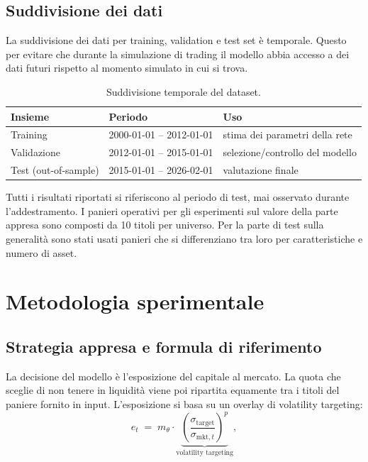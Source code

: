 \subsection{Suddivisione dei dati}
La suddivisione dei dati per training, validation e test set è temporale. 
Questo per evitare che durante la simulazione di trading il modello abbia accesso a dei dati futuri rispetto al momento simulato in cui si trova.

\begin{table}[H]
\centering
\begin{tabular}{lll}
\toprule
Insieme & Periodo & Uso \\
\midrule
Training     & 2000-01-01 -- 2012-01-01 & stima dei parametri della rete \\
Validazione  & 2012-01-01 -- 2015-01-01 & selezione/controllo del modello \\
Test (out-of-sample) & 2015-01-01 -- 2026-02-01 & valutazione finale \\
\bottomrule
\end{tabular}
\caption{Suddivisione temporale del dataset.}
\label{tab:split}
\end{table}

Tutti i risultati riportati si riferiscono al periodo di test, mai
osservato durante l'addestramento. I panieri operativi per gli esperimenti sul valore della parte appresa sono composti da 10
titoli per universo. Per la parte di test sulla generalità sono stati usati panieri che si differenziano tra loro per caratteristiche e numero di asset.


\section{Metodologia sperimentale}
\label{sec:metodi}

\subsection{Strategia appresa e formula di riferimento}
La decisione del modello è l'esposizione del capitale al mercato. 
La quota che sceglie di non tenere in liquidità viene poi ripartita equamente tra i titoli del paniere fornito in input.
L'esposizione si basa su un overlay di volatility targeting:
\[
  e_t \;=\; m_\theta \cdot \underbrace{\left(\frac{\sigma_{\text{target}}}{\sigma_{\text{mkt},t}}\right)^{p}}_{\text{volatility targeting}},
\]

